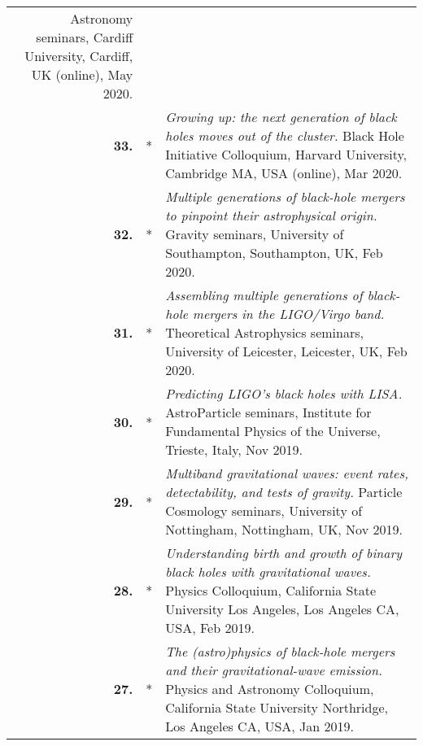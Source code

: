 {\begin{longtable}{rp{0.3cm}p{15.8cm}}
\newline{}
Astronomy seminars, Cardiff University, Cardiff, UK (online), May 2020.
\vspace{0.05cm}\\
%
\textbf{33.} & * & \textit{Growing up: the next generation of black holes moves out of the cluster.}
\newline{}
Black Hole Initiative Colloquium, Harvard University, Cambridge MA, USA (online), Mar 2020.
\vspace{0.05cm}\\
%
\textbf{32.} & * & \textit{Multiple generations of black-hole mergers to pinpoint their astrophysical origin.}
\newline{}
Gravity seminars, University of Southampton, Southampton, UK, Feb 2020.
\vspace{0.05cm}\\
%
\textbf{31.} & * & \textit{Assembling multiple generations of black-hole mergers in the LIGO/Virgo band.}
\newline{}
Theoretical Astrophysics seminars, University of Leicester, Leicester, UK, Feb 2020.
\vspace{0.05cm}\\
%
\textbf{30.} & * & \textit{Predicting LIGO's black holes with LISA.}
\newline{}
AstroParticle seminars, Institute for Fundamental Physics of the Universe, Trieste, Italy, Nov 2019.
\vspace{0.05cm}\\
%
\textbf{29.} & * & \textit{Multiband gravitational waves: event rates, detectability, and tests of gravity.}
\newline{}
Particle Cosmology seminars, University of Nottingham, Nottingham, UK, Nov 2019.
\vspace{0.05cm}\\
%
\textbf{28.} & * & \textit{Understanding birth and growth of binary black holes with gravitational waves.}
\newline{}
Physics Colloquium, California State University Los Angeles, Los Angeles CA, USA, Feb 2019.
\vspace{0.05cm}\\
%
\textbf{27.} & * & \textit{The (astro)physics of black-hole mergers and their gravitational-wave emission.}
\newline{}
Physics and Astronomy Colloquium, California State University Northridge, Los Angeles CA, USA, Jan 2019.
\vspace{0.05cm}\\

\end{longtable}}
